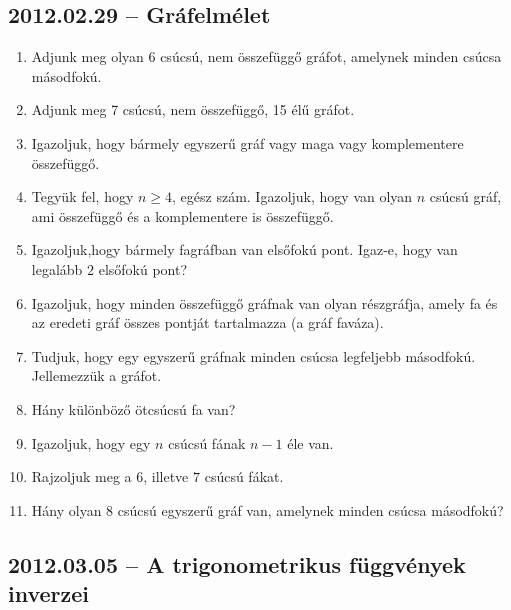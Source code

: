 \subsection*{2012.02.29 -- Gráfelmélet}
\begin{enumerate}
\item Adjunk meg olyan $6$ csúcsú, nem összefüggő gráfot, amelynek minden csúcsa másodfokú.

\item Adjunk meg  7 csúcsú, nem összefüggő, 15 élű gráfot.

\item Igazoljuk, hogy bármely egyszerű gráf vagy maga vagy komplementere összefüggő.

\item Tegyük fel, hogy $n\geq 4$, egész szám. Igazoljuk, hogy van olyan $n$ csúcsú gráf, ami összefüggő és a komplementere is összefüggő.

\item Igazoljuk,hogy bármely fagráfban van elsőfokú pont. Igaz-e, hogy van legalább $2$ elsőfokú pont?

\item Igazoljuk, hogy minden összefüggő gráfnak van olyan részgráfja, amely fa és az eredeti gráf összes pontját tartalmazza (a gráf faváza).

\item Tudjuk, hogy egy egyszerű gráfnak minden csúcsa legfeljebb másodfokú. Jellemezzük a gráfot.

\item Hány különböző  ötcsúcsú fa van?

\item Igazoljuk, hogy egy $n$ csúcsú fának $n-1$ éle van.

\item Rajzoljuk meg a $6$, illetve $7$ csúcsú fákat.

\item Hány olyan $8$ csúcsú egyszerű gráf van, amelynek minden csúcsa másodfokú?

\end{enumerate}


\newpage
\subsection*{2012.03.05 -- A trigonometrikus függvények inverzei}

